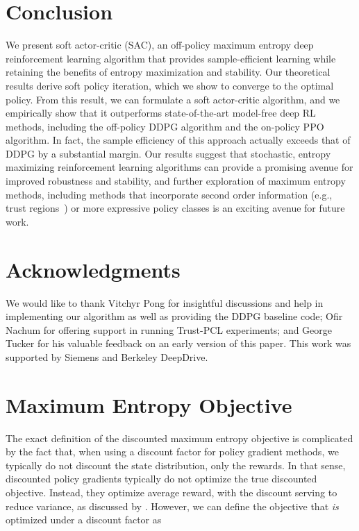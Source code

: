 \documentclass{article}
\begin{document}
\newpage
\section{Conclusion}



We present soft actor-critic (SAC), an off-policy maximum entropy deep reinforcement learning algorithm that provides sample-efficient learning while retaining the benefits of entropy maximization and stability. Our theoretical results derive soft policy iteration, which we show to converge to the optimal policy. From this result, we can formulate a soft actor-critic algorithm, and we empirically show that it outperforms state-of-the-art model-free deep RL methods, including the off-policy DDPG algorithm and the on-policy PPO algorithm. In fact, the sample efficiency of this approach actually exceeds that of DDPG by a substantial margin. Our results suggest that stochastic, entropy maximizing reinforcement learning algorithms can provide a promising avenue for improved robustness and stability, and further exploration of maximum entropy methods, including methods that incorporate second order information (e.g., trust regions~\citep{schulman2015trust}) or more expressive policy classes is an exciting avenue for future work.


\section*{Acknowledgments}
We would like to thank Vitchyr Pong for insightful discussions and help in implementing our algorithm as well as providing the DDPG baseline code; Ofir Nachum for offering support in running Trust-PCL experiments; and George Tucker for his valuable feedback on an early version of this paper. This work was supported by Siemens and Berkeley DeepDrive.

\newpage


\FloatBarrier







\newpage
\onecolumn
\appendix


\section{Maximum Entropy Objective}
\label{app:objective}
The exact definition of the discounted maximum entropy objective is complicated by the fact that, when using a discount factor for policy gradient methods, we typically do not discount the state distribution, only the rewards. In that sense, discounted policy gradients typically do not optimize the true discounted objective. Instead, they optimize average reward, with the discount serving to reduce variance, as discussed by \citet{thomas2014bias}. However, we can define the objective that \emph{is} optimized under a discount factor as
\end{document}
